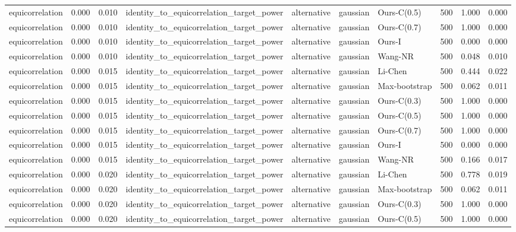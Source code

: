 \begin{tabular}{lrrllllrrr}
equicorrelation & 0.000 & 0.010 & identity\_to\_equicorrelation\_target\_power & alternative & gaussian & Ours-C(0.5) & 500 & 1.000 & 0.000 \\
equicorrelation & 0.000 & 0.010 & identity\_to\_equicorrelation\_target\_power & alternative & gaussian & Ours-C(0.7) & 500 & 1.000 & 0.000 \\
equicorrelation & 0.000 & 0.010 & identity\_to\_equicorrelation\_target\_power & alternative & gaussian & Ours-I & 500 & 0.000 & 0.000 \\
equicorrelation & 0.000 & 0.010 & identity\_to\_equicorrelation\_target\_power & alternative & gaussian & Wang-NR & 500 & 0.048 & 0.010 \\
equicorrelation & 0.000 & 0.015 & identity\_to\_equicorrelation\_target\_power & alternative & gaussian & Li-Chen & 500 & 0.444 & 0.022 \\
equicorrelation & 0.000 & 0.015 & identity\_to\_equicorrelation\_target\_power & alternative & gaussian & Max-bootstrap & 500 & 0.062 & 0.011 \\
equicorrelation & 0.000 & 0.015 & identity\_to\_equicorrelation\_target\_power & alternative & gaussian & Ours-C(0.3) & 500 & 1.000 & 0.000 \\
equicorrelation & 0.000 & 0.015 & identity\_to\_equicorrelation\_target\_power & alternative & gaussian & Ours-C(0.5) & 500 & 1.000 & 0.000 \\
equicorrelation & 0.000 & 0.015 & identity\_to\_equicorrelation\_target\_power & alternative & gaussian & Ours-C(0.7) & 500 & 1.000 & 0.000 \\
equicorrelation & 0.000 & 0.015 & identity\_to\_equicorrelation\_target\_power & alternative & gaussian & Ours-I & 500 & 0.000 & 0.000 \\
equicorrelation & 0.000 & 0.015 & identity\_to\_equicorrelation\_target\_power & alternative & gaussian & Wang-NR & 500 & 0.166 & 0.017 \\
equicorrelation & 0.000 & 0.020 & identity\_to\_equicorrelation\_target\_power & alternative & gaussian & Li-Chen & 500 & 0.778 & 0.019 \\
equicorrelation & 0.000 & 0.020 & identity\_to\_equicorrelation\_target\_power & alternative & gaussian & Max-bootstrap & 500 & 0.062 & 0.011 \\
equicorrelation & 0.000 & 0.020 & identity\_to\_equicorrelation\_target\_power & alternative & gaussian & Ours-C(0.3) & 500 & 1.000 & 0.000 \\
equicorrelation & 0.000 & 0.020 & identity\_to\_equicorrelation\_target\_power & alternative & gaussian & Ours-C(0.5) & 500 & 1.000 & 0.000 \\

\end{tabular}
